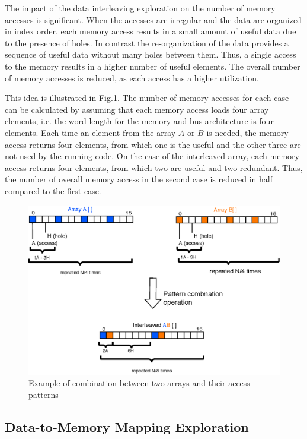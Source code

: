 \documentclass[prodmode,acmtodaes]{acmsmall}
\begin{document}
The impact of the data interleaving exploration on the number of memory accesses is significant.
When the accesses are irregular and the data are organized in index order, each memory access results in a small amount of useful data due to the presence of holes.
In contrast the re-organization of the data provides a sequence of useful data without many holes between them.
Thus, a single access to the memory results in a higher number of useful elements.
The overall number of memory accesses is reduced, as each access has a higher utilization.

This idea is illustrated in Fig.\ref{fig:algebra}.
The number of memory accesses for each case can be calculated by assuming that each memory access loads four array elements, i.e. the word length for the memory and bus architecture is four elements.
Each time an element from the array $A$ or $B$ is needed, the memory access returns four elements, from which one is the useful and the other three are not used by the running code.
On the case of the interleaved array, each memory access returns four elements, from which two are useful and two redundant.
Thus, the number of overall memory access in the second case is reduced in half compared to the first case.

\begin{figure}
\centering
	\caption{Example of combination between two arrays and their access patterns}
	\label{fig:algebra}
	\includegraphics[scale = 0.5]{Images/Algebra.eps} 
\end{figure}

\subsection{Data-to-Memory Mapping Exploration}
\end{document}
